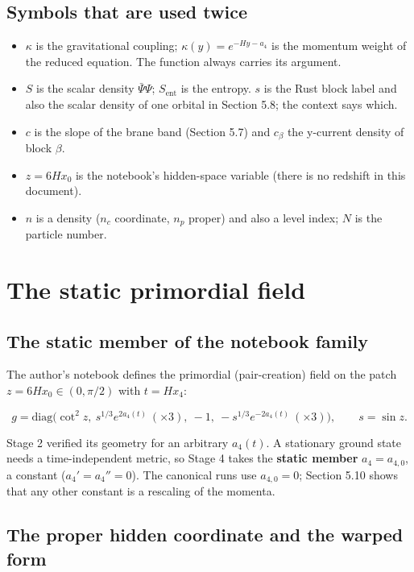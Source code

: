 \documentclass[11pt]{article}
\begin{document}
\subsection{Symbols that are used twice}

\begin{itemize}
\item $\kappa$ is the gravitational coupling; $\kappa(y)=e^{-Hy-a_4}$ is the momentum weight of the reduced equation. The function always carries its argument.
\item $S$ is the scalar density $\bar\Psi\Psi$; $S_{\mathrm{ent}}$ is the entropy. $s$ is the Rust block label and also the scalar density of one orbital in Section 5.8; the context says which.
\item $c$ is the slope of the brane band (Section 5.7) and $c_\beta$ the y-current density of block $\beta$.
\item $z=6Hx_0$ is the notebook's hidden-space variable (there is no redshift in this document).
\item $n$ is a density ($n_c$ coordinate, $n_p$ proper) and also a level index; $N$ is the particle number.
\end{itemize}

\section{The static primordial field}

\subsection{The static member of the notebook family}

The author's notebook defines the primordial (pair-creation) field on the patch $z=6Hx_0\in(0,\pi/2)$ with $t=Hx_4$:

\[
g=\mathrm{diag}\bigl(\cot^2z,\ s^{1/3}e^{2a_4(t)}\ (\times3),\ -1,\ -s^{1/3}e^{-2a_4(t)}\ (\times3)\bigr),\qquad s=\sin z .
\]

Stage 2 verified its geometry for an arbitrary $a_4(t)$. A stationary ground state needs a time-independent metric, so Stage 4 takes the \textbf{static member} $a_4=a_{4,0}$, a constant ($a_4'=a_4''=0$). The canonical runs use $a_{4,0}=0$; Section 5.10 shows that any other constant is a rescaling of the momenta.

\subsection{The proper hidden coordinate and the warped form}
\end{document}
